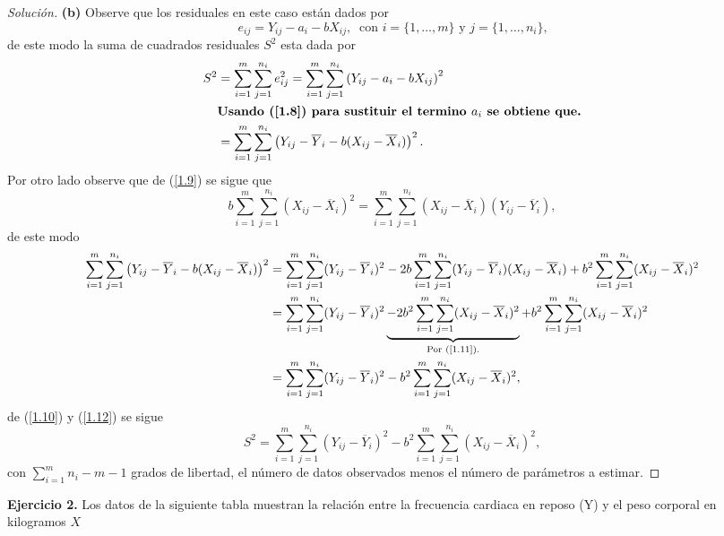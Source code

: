 \documentclass[10.5pt,notitlepage]{article}
\newenvironment{solucion}
  {\begin{proof}[Solución]}
  {\end{proof}}
\newcommand{\pare}[1]{\left( #1 \right)}
\begin{document}
\begin{solucion}
\noindent \textbf{(b)} Observe que los residuales en este caso están dados por 
\[
e_{ij} = Y_{ij} - a_i - bX_{ij}, \ \text{ con \(i=\{1,\hdots,m\}\) y \(j = \{1,\hdots,n_i\}\),}
\]
de este modo la suma de cuadrados residuales \(S^2\) esta dada por 
\begin{align}
    S^2 &= \sum_{i = 1}^{m}\sum_{j = 1}^{n_i}e_{ij}^2 = \sum_{i = 1}^{m}\sum_{j = 1}^{n_i}\pare{Y_{ij} - a_i - bX_{ij}}^2 \nonumber\\
        &\textbf{Usando (\ref{1.8}) para sustituir el termino \(a_i\) se obtiene que.}\nonumber\\
        &= \sum_{i = 1}^{m}\sum_{j = 1}^{n_i}\pare{Y_{ij} - \overline{Y}_i -b(X_{ij} - \overline{X}_i)}^2. \label{1.10}
\end{align}
Por otro lado observe que de (\ref{1.9}) se sigue que 
\begin{equation}\label{1.11}
     b \sum_{i = 1}^{m}\sum_{j = 1}^{n_i}(X_{ij} - \overline{X}_i)^2 =  \sum_{i = 1}^{m}\sum_{j = 1}^{n_i}(X_{ij} - \overline{X}_i)(Y_{ij} - \overline{Y}_i),
\end{equation}
de este modo
\begin{align}
     \sum_{i = 1}^{m}\sum_{j = 1}^{n_i}\pare{Y_{ij} - \overline{Y}_i -b(X_{ij} - \overline{X}_i)}^2 &=   \sum_{i = 1}^{m}\sum_{j = 1}^{n_i}(Y_{ij} - \overline{Y}_i)^2-2b \sum_{i = 1}^{m}\sum_{j = 1}^{n_i}(Y_{ij} - \overline{Y}_i)(X_{ij} - \overline{X}_i)+b^2 \sum_{i = 1}^{m}\sum_{j = 1}^{n_i}(X_{ij} - \overline{X}_i)^2\nonumber\\ 
    &=   \sum_{i = 1}^{m}\sum_{j = 1}^{n_i}(Y_{ij} - \overline{Y}_i)^2 \underbrace{- 2b^2 \sum_{i = 1}^{m}\sum_{j = 1}^{n_i}(X_{ij} - \overline{X}_i)^2}_{\text{Por (\ref{1.11}).}}+ b^2 \sum_{i = 1}^{m}\sum_{j = 1}^{n_i}(X_{ij} - \overline{X}_i)^2\nonumber\\ 
    &=  \sum_{i = 1}^{m}\sum_{j = 1}^{n_i}(Y_{ij} - \overline{Y}_i)^2 - b^2 \sum_{i = 1}^{m}\sum_{j = 1}^{n_i}(X_{ij} - \overline{X}_i)^2 \label{1.12}, 
\end{align}
de (\ref{1.10}) y (\ref{1.12}) se sigue 
\[
S^2 = \sum_{i = 1}^{m}\sum_{j = 1}^{n_i}(Y_{ij} - \overline{Y}_i)^2 - b^2\sum_{i = 1}^{m}\sum_{j = 1}^{n_i}(X_{ij} - \overline{X}_i)^2,
\]
con \(\sum_{i = 1}^{m}n_i - m -1\) grados de libertad, el número de datos observados menos el número de parámetros a estimar.
\end{solucion}
\noindent \textbf{Ejercicio 2.} Los datos de la siguiente tabla muestran la relación entre la frecuencia cardiaca en reposo (Y) y el peso corporal en kilogramos \(X\)
\\
\end{document}
